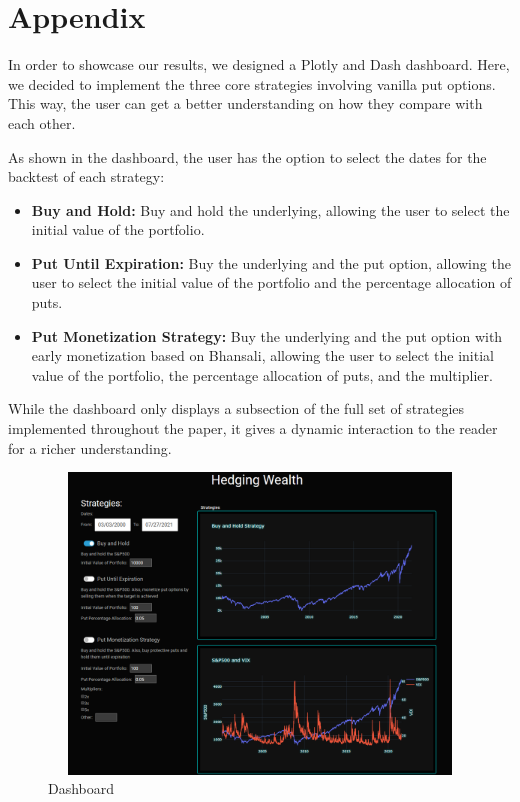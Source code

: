\documentclass[12pt]{article}
\begin{document}
{{\section{Appendix}

In order to showcase our results, we designed a Plotly and Dash dashboard. Here, we decided to implement the three core strategies involving vanilla put options. This way, the user can get a better understanding on how they compare with each other. 

As shown in the dashboard, the user has the option to select the dates for the backtest of each strategy:

\begin{itemize}
\item \textbf{Buy and Hold:} Buy and hold the underlying, allowing the user to select the initial value of the portfolio.
\item \textbf{Put Until Expiration:} Buy the underlying and the put option, allowing the user to select the initial value of the portfolio and the percentage allocation of puts.
\item \textbf{Put Monetization Strategy:} Buy the underlying and the put option with early monetization based on Bhansali, allowing the user to select the initial value of the portfolio, the percentage allocation of puts, and the multiplier.
\end{itemize}

While the dashboard only displays a subsection of the full set of strategies implemented throughout the paper, it gives a dynamic interaction to the reader for a richer understanding.

\begin{figure}[htp]
    \centering
    \includegraphics[width=13cm, height=8cm]{Hedging_wealth.png}
    \caption{Dashboard}
    \label{fig:galaxy}
\end{figure}

}}
\end{document}
